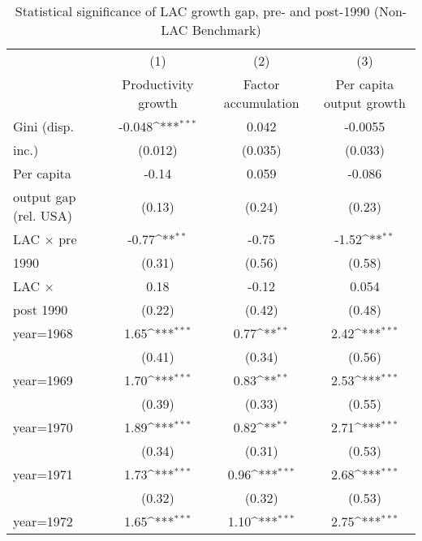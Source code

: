 \begin{sidewaystable}[htbp]\centering
\def\sym#1{\ifmmode^{#1}\else\(^{#1}\)\fi}
\caption{Statistical significance of LAC growth gap, pre- and post-1990 (Non-LAC Benchmark)}
\begin{tabular}{l*{3}{c}}
\toprule
                &\multicolumn{1}{c}{(1)}&\multicolumn{1}{c}{(2)}&\multicolumn{1}{c}{(3)}\\
                &\multicolumn{1}{c}{Productivity growth}&\multicolumn{1}{c}{Factor accumulation}&\multicolumn{1}{c}{Per capita output growth}\\
\midrule
Gini (disp.     &   -0.048\sym{***}&    0.042         &  -0.0055         \\
inc.)           &  (0.012)         &  (0.035)         &  (0.033)         \\
\addlinespace
Per capita      &    -0.14         &    0.059         &   -0.086         \\
output gap (rel. USA)&   (0.13)         &   (0.24)         &   (0.23)         \\
\addlinespace
LAC $\times$ pre&    -0.77\sym{**} &    -0.75         &    -1.52\sym{**} \\
1990            &   (0.31)         &   (0.56)         &   (0.58)         \\
\addlinespace
LAC $\times$    &     0.18         &    -0.12         &    0.054         \\
post 1990       &   (0.22)         &   (0.42)         &   (0.48)         \\
\addlinespace
year=1968       &     1.65\sym{***}&     0.77\sym{**} &     2.42\sym{***}\\
                &   (0.41)         &   (0.34)         &   (0.56)         \\
\addlinespace
year=1969       &     1.70\sym{***}&     0.83\sym{**} &     2.53\sym{***}\\
                &   (0.39)         &   (0.33)         &   (0.55)         \\
\addlinespace
year=1970       &     1.89\sym{***}&     0.82\sym{**} &     2.71\sym{***}\\
                &   (0.34)         &   (0.31)         &   (0.53)         \\
\addlinespace
year=1971       &     1.73\sym{***}&     0.96\sym{***}&     2.68\sym{***}\\
                &   (0.32)         &   (0.32)         &   (0.53)         \\
\addlinespace
year=1972       &     1.65\sym{***}&     1.10\sym{***}&     2.75\sym{***}\\

\end{tabular}
\end{sidewaystable}
